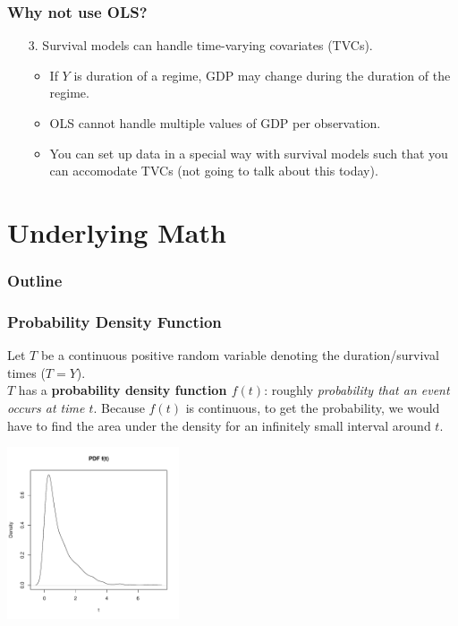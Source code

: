 \documentclass{beamer}
\begin{document}
\begin{frame}
\frametitle{Why not use OLS?}
\begin{enumerate}
\item[3.] Survival models can handle time-varying covariates (TVCs).
\begin{itemize}
\pause
\item If $Y$ is duration of a regime, GDP may change during the
duration of the regime.
\pause
\item OLS cannot handle multiple values of GDP per observation.
\pause
\item You can set up data in a special way with survival models such
that you can accomodate TVCs (not going to talk about this today).
\end{itemize}
\end{enumerate}
\end{frame}

\section{Underlying Math}

\begin{frame}
\frametitle{Outline}
\tableofcontents[currentsection]
\end{frame}

\begin{frame}
\frametitle{Probability Density Function}
\pause
Let $T$ be a continuous positive random variable denoting the duration/survival
times ($T = Y$).\\
\pause
\bigskip
$T$ has a \textbf{probability density function $f(t)$}: roughly
\emph{probability that an event occurs at time $t$}.
\pause
Because $f(t)$ is continuous, to get the probability, we would have to find the area
under the density for an infinitely small interval around $t$.
\pause
\begin{center}
\includegraphics[width = 2in, height = 2in]{survival_present-pdf.pdf}
\end{center}
\end{frame}
\end{document}
